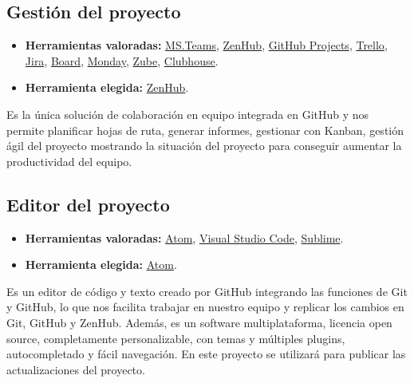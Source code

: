 \subsection{Gestión del proyecto}\label{4:ZenHub}
\begin{itemize}
    \item \textbf{Herramientas valoradas:} \href{https://teams.microsoft.com/}{MS.Teams}, \href{https://www.zenhub.com/}{ZenHub}, \href{https://github.com/}{GitHub Projects}, \href{https://www.zenhub.com/}{Trello}, \href{https://www.atlassian.com/es/software/jira}{Jira}, \href{https://www.board.com/es#gref}{Board}, \href{https://monday.com/lang/es/}{Monday}, \href{https://zube.io/}{Zube}, \href{https://clubhouse.io/}{Clubhouse}.
    \item \textbf{Herramienta elegida:} \href{https://www.zenhub.com/}{ZenHub}.
\end{itemize}

Es la única solución de colaboración en equipo integrada en GitHub y nos permite planificar hojas de ruta, generar informes, gestionar con Kanban, gestión ágil del proyecto mostrando la situación del proyecto para conseguir aumentar la productividad del equipo.

\subsection{Editor del proyecto}\label{4:ATOM}
\begin{itemize}
    \item \textbf{Herramientas valoradas:} \href{https://atom.io/}{Atom}, \href{https://code.visualstudio.com/}{Visual Studio Code}, \href{https://www.sublimetext.com/}{Sublime}.
    \item \textbf{Herramienta elegida:} \href{https://atom.io/}{Atom}.
\end{itemize}

Es un editor de código y texto creado por GitHub integrando las funciones de Git y GitHub, lo que nos facilita trabajar en nuestro equipo y replicar los cambios en Git, GitHub y ZenHub. Además, es un software multiplataforma, licencia open source, completamente personalizable, con temas y múltiples plugins, autocompletado y fácil navegación.
En este proyecto se utilizará para publicar las actualizaciones del proyecto.



